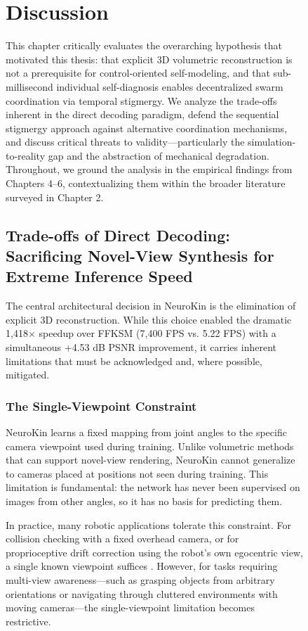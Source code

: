 \documentclass[12pt,a4paper,oneside]{report}
\begin{document}
\begin{figure}[H]
\chapter{Discussion}
\label{chap:discussion_main_ch7}

This chapter critically evaluates the overarching hypothesis that motivated this thesis: that explicit 3D volumetric reconstruction is not a prerequisite for control-oriented self-modeling, and that sub-millisecond individual self-diagnosis enables decentralized swarm coordination via temporal stigmergy. We analyze the trade-offs inherent in the direct decoding paradigm, defend the sequential stigmergy approach against alternative coordination mechanisms, and discuss critical threats to validity---particularly the simulation-to-reality gap and the abstraction of mechanical degradation. Throughout, we ground the analysis in the empirical findings from Chapters 4--6, contextualizing them within the broader literature surveyed in Chapter 2.

\section{Trade-offs of Direct Decoding: Sacrificing Novel-View Synthesis for Extreme Inference Speed}

The central architectural decision in NeuroKin is the elimination of explicit 3D reconstruction. While this choice enabled the dramatic 1,418$\times$ speedup over FFKSM (7,400 FPS vs. 5.22 FPS) with a simultaneous +4.53 dB PSNR improvement, it carries inherent limitations that must be acknowledged and, where possible, mitigated.

\subsection{The Single-Viewpoint Constraint}

NeuroKin learns a fixed mapping from joint angles to the specific camera viewpoint used during training. Unlike volumetric methods that can support novel-view rendering, NeuroKin cannot generalize to cameras placed at positions not seen during training. This limitation is fundamental: the network has never been supervised on images from other angles, so it has no basis for predicting them.

In practice, many robotic applications tolerate this constraint. For collision checking with a fixed overhead camera, or for proprioceptive drift correction using the robot's own egocentric view, a single known viewpoint suffices \cite{hu2024teaching, chen2022full}. However, for tasks requiring multi-view awareness---such as grasping objects from arbitrary orientations or navigating through cluttered environments with moving cameras---the single-viewpoint limitation becomes restrictive.


\end{figure}
\end{document}
